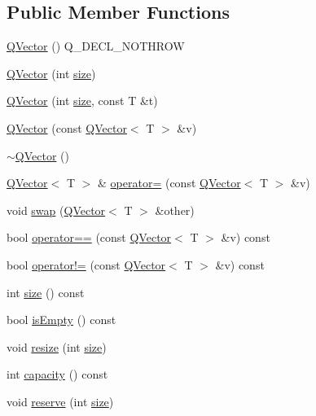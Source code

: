 \subsection*{Public Member Functions}
\begin{DoxyCompactItemize}
\item 
\hyperlink{class_q_vector_a93e8a3fa9e7f4934e5f97494ad17f518}{Q\+Vector} () Q\+\_\+\+D\+E\+C\+L\+\_\+\+N\+O\+T\+H\+R\+OW
\item 
\hyperlink{class_q_vector_a000f527522e85e6682807ff7edd9467f}{Q\+Vector} (int \hyperlink{class_q_vector_aa5739a6bcb52f9b9532ac661cca45b8b}{size})
\item 
\hyperlink{class_q_vector_a2c9d422d62125b04a4835de82666e9f2}{Q\+Vector} (int \hyperlink{class_q_vector_aa5739a6bcb52f9b9532ac661cca45b8b}{size}, const T \&t)
\item 
\hyperlink{class_q_vector_a58c57c94049f372ea119f2b0c60fc357}{Q\+Vector} (const \hyperlink{class_q_vector}{Q\+Vector}$<$ T $>$ \&v)
\item 
\hyperlink{class_q_vector_ada8501475bf1f9eb3e1aa6d70c84b79c}{$\sim$\+Q\+Vector} ()
\item 
\hyperlink{class_q_vector}{Q\+Vector}$<$ T $>$ \& \hyperlink{class_q_vector_a36236603096c0c02def1c0d43f3ebbf5}{operator=} (const \hyperlink{class_q_vector}{Q\+Vector}$<$ T $>$ \&v)
\item 
void \hyperlink{class_q_vector_a35254d6c26569b985958b2ed15695fb6}{swap} (\hyperlink{class_q_vector}{Q\+Vector}$<$ T $>$ \&other)
\item 
bool \hyperlink{class_q_vector_a4d4ee275a13de28d0da7e49085ba7a7d}{operator==} (const \hyperlink{class_q_vector}{Q\+Vector}$<$ T $>$ \&v) const 
\item 
bool \hyperlink{class_q_vector_a7c3c88c0f770426a9b9dbb77ba1dcbfe}{operator!=} (const \hyperlink{class_q_vector}{Q\+Vector}$<$ T $>$ \&v) const 
\item 
int \hyperlink{class_q_vector_aa5739a6bcb52f9b9532ac661cca45b8b}{size} () const 
\item 
bool \hyperlink{class_q_vector_a23ddd6fbfe38f8c34f69b5af89e97000}{is\+Empty} () const 
\item 
void \hyperlink{class_q_vector_a12d291b2dda474720c33a97bfe1b0973}{resize} (int \hyperlink{class_q_vector_aa5739a6bcb52f9b9532ac661cca45b8b}{size})
\item 
int \hyperlink{class_q_vector_a160560e2aab0840e0de275ae9ca48f7a}{capacity} () const 
\item 
void \hyperlink{class_q_vector_aab71cce382721d176d1445434ae18e6a}{reserve} (int \hyperlink{class_q_vector_aa5739a6bcb52f9b9532ac661cca45b8b}{size})

\end{DoxyCompactItemize}
